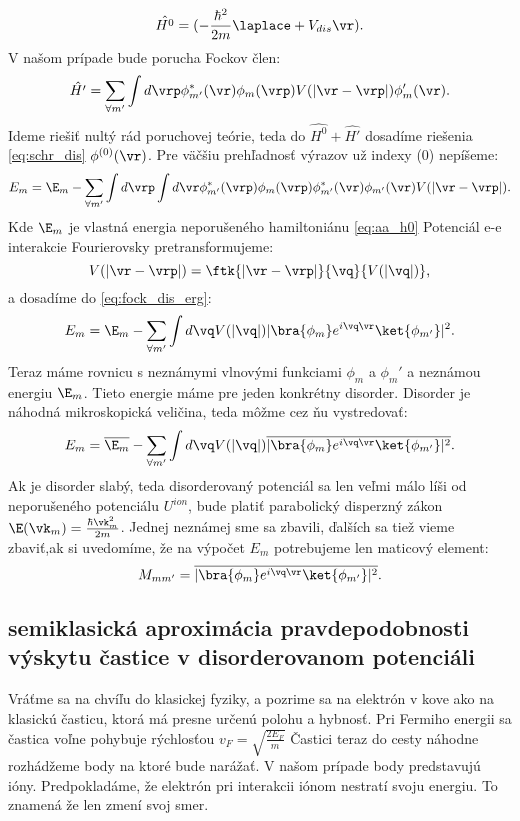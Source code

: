 \begin{equation}
\label{eq:aa_h0}
\hat{H^{0}}=(-\frac{\hbar^2}{2m}\laplace + V_{dis}{\vr}) \text{.}
\end{equation}
V našom prípade bude porucha Fockov člen:
\begin{equation}
 \label{eq:porucha}
 \hat{H'}=\sum_{\forall m'} \int d\vrp \phi^*_{m'}(\vr)\phi_{m}(\vrp)V(|\vr-\vrp|)\phi_m'(\vr) \text{.}
\end{equation}
Ideme riešiť nultý rád poruchovej teórie, teda do $\hat{H^0}+\hat{H'}$ dosadíme riešenia \eqref{eq:schr_dis} $\phi^{(0)}(\vr)$.
Pre väčšiu prehľadnosť výrazov už indexy (0) nepíšeme:
\begin{equation}
 \label{eq:fock_dis_erg}
 E_m=\E_m-\sum_{\forall m'} \int d\vrp \int d\vr \phi^*_{m'}(\vrp) \phi_{m}(\vrp)\phi^*_{m'}(\vr)\phi_{m'}(\vr)V(|\vr-\vrp|) \text{.}
\end{equation}
Kde $\E_m$ je vlastná energia neporušeného hamiltoniánu \eqref{eq:aa_h0}
Potenciál e-e interakcie Fourierovsky pretransformujeme:
\begin{equation}
 \label{eq:V_ft}
 V(|\vr-\vrp|)=\ftk{|\vr-\vrp|}{\vq}{V(|\vq|)}\text{,}
\end{equation}
a dosadíme do \eqref{eq:fock_dis_erg}:
\begin{equation}
\label{eq:erg_V_ft}
 E_m=\E_m-\sum_{\forall m'} \int d\vq V(|\vq|) |\bra{\phi_m}e^{i\vq\vr}\ket{\phi_{m'}}|^2 \text{.}
\end{equation}
Teraz máme rovnicu s neznámymi vlnovými funkciami $\phi_m$ a $\phi_m'$ a neznámou energiu $\E_m$. Tieto energie máme pre jeden konkrétny disorder.
Disorder je náhodná mikroskopická veličina, teda môžme cez ňu vystredovať:
\begin{equation}
\label{eq:erg_meandis}
 E_m=\overline{\E_m}-\sum_{\forall m'} \int d\vq V(|\vq|) \overline{|\bra{\phi_m}e^{i\vq\vr}\ket{\phi_{m'}}|^2} \text{.}
\end{equation}
Ak je disorder slabý, teda disorderovaný potenciál sa len veľmi málo líši od neporušeného potenciálu $U^{ion}$,
bude platiť parabolický disperzný zákon $\E(\vk_m)=\frac{\hbar \vk_m^2}{2m}$. Jednej neznámej sme sa zbavili,
ďalších sa tiež vieme zbaviť,ak si uvedomíme, že na výpočet $E_m$ potrebujeme len maticový element:
\begin{equation}
\label{eq:aa_matrix_element}
 M_{mm'}=\overline{|\bra{\phi_m}e^{i\vq\vr}\ket{\phi_{m'}}|^2} \text{.}
\end{equation}
\subsection{semiklasická aproximácia pravdepodobnosti výskytu častice v disorderovanom potenciáli}
Vráťme sa na chvíľu do klasickej fyziky, a pozrime sa na elektrón v kove ako na klasickú časticu,
ktorá má presne určenú polohu a hybnosť. Pri Fermiho energii sa častica voľne pohybuje rýchlosťou $v_F=\sqrt{\frac{2E_F}{m}}$
Častici teraz do cesty náhodne rozhádžeme body na ktoré bude narážať. V našom prípade body predstavujú ióny.
Predpokladáme, že elektrón pri interakcii iónom nestratí svoju energiu. To znamená že len zmení svoj smer.


